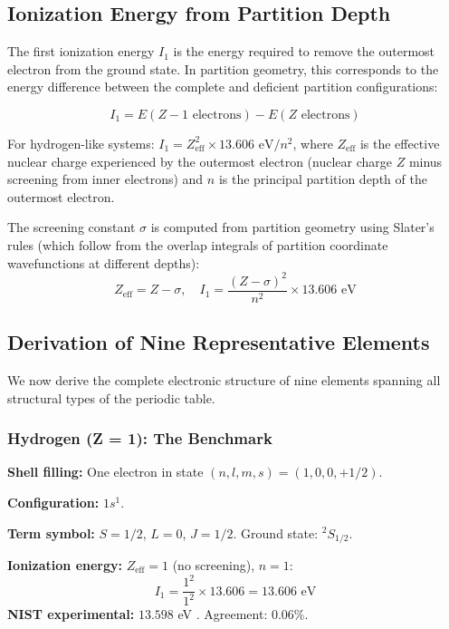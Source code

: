 \documentclass[11pt,a4paper]{article}
\theoremstyle{definition}
\theoremstyle{remark}
\begin{document}
\subsection{Ionization Energy from Partition Depth}

The first ionization energy $I_1$ is the energy required to remove the outermost electron from the ground state. In partition geometry, this corresponds to the energy difference between the complete and deficient partition configurations:

\begin{equation}
I_1 = E(Z-1 \text{ electrons}) - E(Z \text{ electrons})
\label{eq:ionization}
\end{equation}

For hydrogen-like systems: $I_1 = Z_{\mathrm{eff}}^2 \times 13.606 \text{ eV} / n^2$, where $Z_{\mathrm{eff}}$ is the effective nuclear charge experienced by the outermost electron (nuclear charge $Z$ minus screening from inner electrons) and $n$ is the principal partition depth of the outermost electron.

The screening constant $\sigma$ is computed from partition geometry using Slater's rules (which follow from the overlap integrals of partition coordinate wavefunctions at different depths):
\begin{equation}
Z_{\mathrm{eff}} = Z - \sigma, \quad I_1 = \frac{(Z - \sigma)^2}{n^2} \times 13.606 \text{ eV}
\label{eq:slater}
\end{equation}

\subsection{Derivation of Nine Representative Elements}

We now derive the complete electronic structure of nine elements spanning all structural types of the periodic table.

\subsubsection{Hydrogen (Z = 1): The Benchmark}

\textbf{Shell filling:} One electron in state $(n, l, m, s) = (1, 0, 0, +1/2)$.

\textbf{Configuration:} $1s^1$.

\textbf{Term symbol:} $S = 1/2$, $L = 0$, $J = 1/2$. Ground state: ${}^2S_{1/2}$.

\textbf{Ionization energy:} $Z_{\mathrm{eff}} = 1$ (no screening), $n = 1$:
\begin{equation}
I_1 = \frac{1^2}{1^2} \times 13.606 = 13.606 \text{ eV}
\end{equation}
\textbf{NIST experimental:} $13.598$ eV \citep{nist_asd}. Agreement: 0.06\%.
\end{document}
